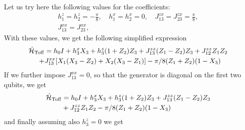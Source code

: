 Let us try here the following values for the coefficients:
\begin{equation}
\begin{gathered}
  h_1^z = h_2^z = -\frac{\pi}{8},\quad
  h_1^x = h_2^x = 0,
  \quad J_{13}^{zx} = J_{23}^{zx} = \frac{\pi}{8}, \\
  J_{13}^{xx} = J_{23}^{xx},
\end{gathered}
\end{equation}
With these values, we get the following simplified expression
\begin{equation}
\begin{aligned}
  \tilde{{\mathcal{H}}}_{\operatorname{Toff}} &= h_0 I + h_3^x X_3 + h_3^z(1+ Z_2)Z_3
  + J_{13}^{zz}(Z_1 - Z_2)Z_3 + J_{12}^{zz} Z_1 Z_2 \\
  + &J_{13}^{xx} [X_1(X_3 - Z_2) + X_2(X_3 - Z_1)]
  - \pi/8 ( Z_1 +  Z_2)(1 - X_3)
\end{aligned}
\end{equation}
If we further impose $J_{13}^{xx}=0$, so that the generator is diagonal on the first two qubits, we get
\begin{equation}
\begin{aligned}
    \tilde{{\mathcal{H}}}_{\operatorname{Toff}} &= h_0 I + h_3^x X_3 + h_3^z(1+ Z_2)Z_3
    + J_{13}^{zz}(Z_1 - Z_2)Z_3 \\
    &+ J_{12}^{zz} Z_1 Z_2 - \pi/8 (Z_1 +  Z_2)(1 - X_3)
\end{aligned}
\end{equation}
and finally assuming also $h_3^z=0$ we get
